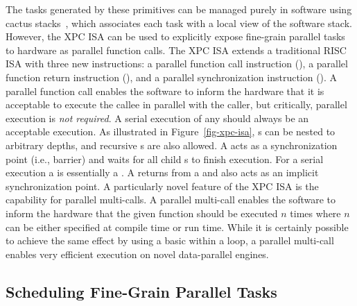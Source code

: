 \begin{figure}
  \begin{minipage}[b]{0.44\tw}
    
  \end{minipage}%
  \hfill%
  \begin{minipage}[b]{0.54\tw}
    
  \end{minipage}
\end{figure}

The tasks generated by these primitives can be managed purely in software
using cactus stacks~\cite{frigo-hyperobjects-spaa2009}, which associates
each task with a local view of the software stack. However, the XPC ISA
can be used to explicitly expose fine-grain parallel tasks to hardware as
parallel function calls. The XPC ISA extends a traditional RISC ISA with
three new instructions: a parallel function call instruction
(), a parallel function return instruction (), and a
parallel synchronization instruction (). A parallel function
call enables the software to inform the hardware that it is acceptable to
execute the callee in parallel with the caller, but critically, parallel
execution is \emph{not required}. A serial execution of any 
should always be an acceptable execution. As illustrated in
Figure~\ref{fig-xpc-isa}, s can be nested to arbitrary depths,
and recursive s are also allowed. A  acts as a
synchronization point (i.e., barrier) and waits for all child s
to finish execution. For a serial execution a  is essentially a
. A  returns from a  and also acts as an
implicit synchronization point. A particularly novel feature of the XPC
ISA is the capability for parallel multi-calls. A parallel multi-call
enables the software to inform the hardware that the given function
should be executed $n$ times where $n$ can be either specified at compile
time or run time. While it is certainly possible to achieve the same
effect by using a basic  within a loop, a parallel multi-call
enables very efficient execution on novel data-parallel engines.

\subsection{Scheduling Fine-Grain Parallel Tasks}

\begin{figure}
  \begin{minipage}[b]{0.53\tw}
    
  \end{minipage}%
  \hfill%
  \begin{minipage}[b]{0.45\tw}
    
  \end{minipage}
\end{figure}

